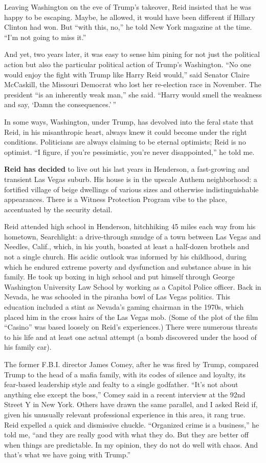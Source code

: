 Leaving Washington on the eve of Trump's takeover, Reid insisted that he
was happy to be escaping. Maybe, he allowed, it would have been
different if Hillary Clinton had won. But ``with this, no,'' he told New
York magazine at the time. ``I'm not going to miss it.''

And yet, two years later, it was easy to sense him pining for not just
the political action but also the particular political action of Trump's
Washington. ``No one would enjoy the fight with Trump like Harry Reid
would,'' said Senator Claire McCaskill, the Missouri Democrat who lost
her re-election race in November. The president ``is an inherently weak
man,'' she said. ``Harry would smell the weakness and say, `Damn the
consequences.' ''

In some ways, Washington, under Trump, has devolved into the feral state
that Reid, in his misanthropic heart, always knew it could become under
the right conditions. Politicians are always claiming to be eternal
optimists; Reid is no optimist. ``I figure, if you're pessimistic,
you're never disappointed,'' he told me.

\textbf{Reid has decided} to live out his last years in Henderson, a
fast-growing and transient Las Vegas suburb. His house is in the upscale
Anthem neighborhood: a fortified village of beige dwellings of various
sizes and otherwise indistinguishable appearances. There is a Witness
Protection Program vibe to the place, accentuated by the security
detail.

Reid attended high school in Henderson, hitchhiking 45 miles each way
from his hometown, Searchlight: a drive-through smudge of a town between
Las Vegas and Needles, Calif., which, in his youth, boasted at least a
half-dozen brothels and not a single church. His acidic outlook was
informed by his childhood, during which he endured extreme poverty and
dysfunction and substance abuse in his family. He took up boxing in high
school and put himself through George Washington University Law School
by working as a Capitol Police officer. Back in Nevada, he was schooled
in the piranha bowl of Las Vegas politics. This education included a
stint as Nevada's gaming chairman in the 1970s, which placed him in the
cross hairs of the Las Vegas mob. (Some of the plot of the film
``Casino'' was based loosely on Reid's experiences.) There were numerous
threats to his life and at least one actual attempt (a bomb discovered
under the hood of his family car).

The former F.B.I. director James Comey, after he was fired by Trump,
compared Trump to the head of a mafia family, with its codes of silence
and loyalty, its fear-based leadership style and fealty to a single
godfather. ``It's not about anything else except the boss,'' Comey said
in a recent interview at the 92nd Street Y in New York. Others have
drawn the same parallel, and I asked Reid if, given his unusually
relevant professional experience in this area, it rang true. Reid
expelled a quick and dismissive chuckle. ``Organized crime is a
business,'' he told me, ``and they are really good with what they do.
But they are better off when things are predictable. In my opinion, they
do not do well with chaos. And that's what we have going with Trump.''

